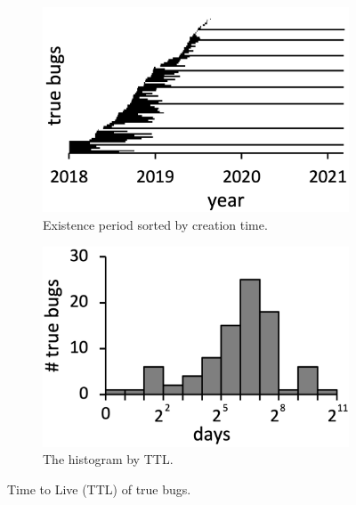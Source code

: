 \begin{figure}
  \centering
  \begin{subfigure}[b]{0.24\textwidth}
    \includegraphics[width=\textwidth]{img/ttl-chro}
    \caption{Existence period sorted by creation time.}
  \end{subfigure}
  \begin{subfigure}[b]{0.24\textwidth}
    \includegraphics[width=\textwidth]{img/ttl-count}
    \caption{The histogram by TTL.}
  \end{subfigure}
  \caption{Time to Live (TTL) of true bugs.}
  \vspace*{-1.5em}
  \label{fig:ttl}
\end{figure}

